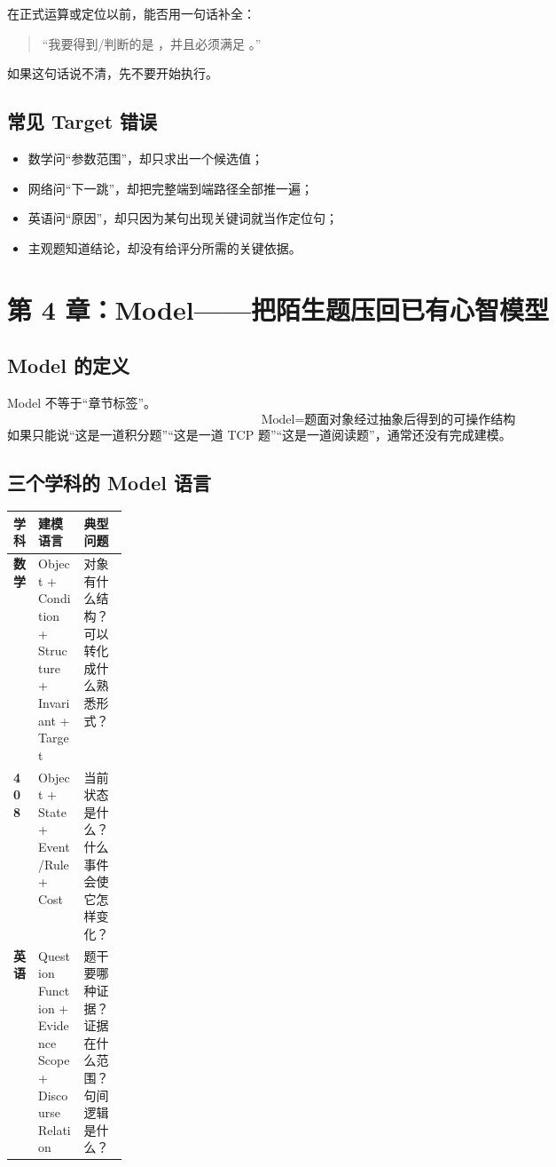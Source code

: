 \documentclass[11pt,a4paper]{ctexart}
\begin{document}
\begin{exam}
在正式运算或定位以前，能否用一句话补全：
\begin{quote}
“我要得到/判断的是 \underline{\hspace{4.5cm}}，并且必须满足 \underline{\hspace{3.2cm}}。”
\end{quote}
如果这句话说不清，先不要开始执行。
\end{exam}

\subsection{常见 Target 错误}
\begin{itemize}
  \item 数学问“参数范围”，却只求出一个候选值；
  \item 网络问“下一跳”，却把完整端到端路径全部推一遍；
  \item 英语问“原因”，却只因为某句出现关键词就当作定位句；
  \item 主观题知道结论，却没有给评分所需的关键依据。
\end{itemize}

\section{第 4 章：Model——把陌生题压回已有心智模型}

\subsection{Model 的定义}
Model 不等于“章节标签”。
\[
\boxed{
\text{Model}
=
\text{题面对象经过抽象后得到的可操作结构}
}
\]
如果只能说“这是一道积分题”“这是一道 TCP 题”“这是一道阅读题”，通常还没有完成建模。

\subsection{三个学科的 Model 语言}
\begin{center}
\small
\begin{tabularx}{\linewidth}{>{\bfseries}p{0.15\linewidth} X X}
\toprule
学科 & 建模语言 & 典型问题 \\
\midrule
数学 & Object + Condition + Structure + Invariant + Target & 对象有什么结构？可以转化成什么熟悉形式？ \\
408 & Object + State + Event/Rule + Cost & 当前状态是什么？什么事件会使它怎样变化？ \\
英语 & Question Function + Evidence Scope + Discourse Relation & 题干要哪种证据？证据在什么范围？句间逻辑是什么？ \\
\bottomrule
\end{tabularx}
\end{center}
\end{document}

